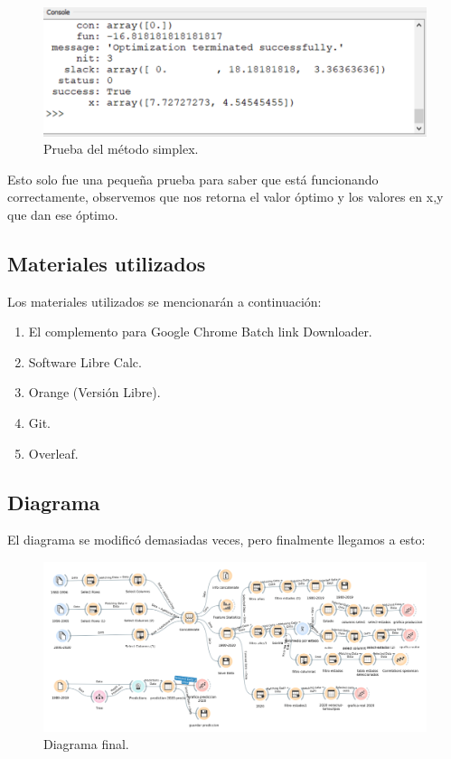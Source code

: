 \documentclass{article}
\begin{document}
\begin{figure}[htb!]
    \centering
    \includegraphics[width = 10 cm]{fo.png}
    \caption{Prueba del método simplex.}
    \label{diagrama}
\end{figure}
Esto solo fue una pequeña prueba para saber que está funcionando correctamente, observemos que nos retorna el valor óptimo y los valores en x,y que dan ese óptimo.


\subsection*{Materiales utilizados}
Los materiales utilizados se mencionarán a continuación:
\begin{enumerate}
    \item El complemento para Google Chrome Batch link Downloader.
    \item Software Libre Calc.
    \item Orange (Versión Libre).
    \item Git.
    \item Overleaf.
\end{enumerate}



\newpage
\subsection*{Diagrama}
El diagrama se modificó demasiadas veces, pero finalmente llegamos a esto:
\begin{figure}[htb!]
    \centering
    \includegraphics[width = 17 cm]{imagenes/diagrama.png}
    \caption{Diagrama final.}
    \label{diagrama}
\end{figure}
\end{document}
